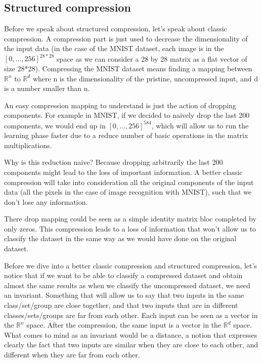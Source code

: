 \documentclass[11pt,a4paper]{article}
\begin{document}
	\subsection{Structured compression}
	Before we speak about structured compression, let's speak about classic compression. A compression part is just used to decrease the dimensionality of the input data (in the case of the MNIST dataset, each image is in the $[0, \dots, 256]^{28*28}$ space as we can consider a 28 by 28 matrix as a flat vector of size 28*28). Compressing the MNIST dataset means finding a mapping between $\mathbb{R}^n$ to $\mathbb{R}^d$ where n is the dimensionality of the pristine, uncompressed input, and d is a number smaller than n.
	
	
	An easy compression mapping to understand is just the action of dropping components. For example in MNIST, if we decided to naively drop the last 200 components, we would end up in $[0,\dots, 256]^{584}$, which will allow us to run the learning phase faster due to a reduce number of basic operations in the matrix multiplications.
	
	
	Why is this reduction naive? Because dropping arbitrarily the last 200 components might lead to the loss of important information. A better classic compression will take into consideration all the original components of the input data (all the pixels in the case of image recognition with MNIST), such that we don't lose any information.
	
	
	There drop mapping could be seen as a simple identity matrix bloc completed by only zeros. This compression leads to a loss of information that won't allow us to classify the dataset in the same way as we would have done on the original dataset.
	
	Before we dive into a better classic compression and structured compression, let's notice that if we want to be able to classify a compressed dataset and obtain almost the same results as when we classify the uncompressed dataset, we need an invariant. Something that will allow us to say that two inputs in the same class/set/group are close together, and that two inputs that are in different classes/sets/groups are far from each other. Each input can be seen as a vector in the $\mathbb{R}^n$ space. After the compression, the same input is a vector in the $\mathbb{R}^d$ space. What comes to mind as an invariant would be a distance, a notion that expresses clearly the fact that two inputs are similar when they are close to each other, and different when they are far from each other.
	
\end{document}
